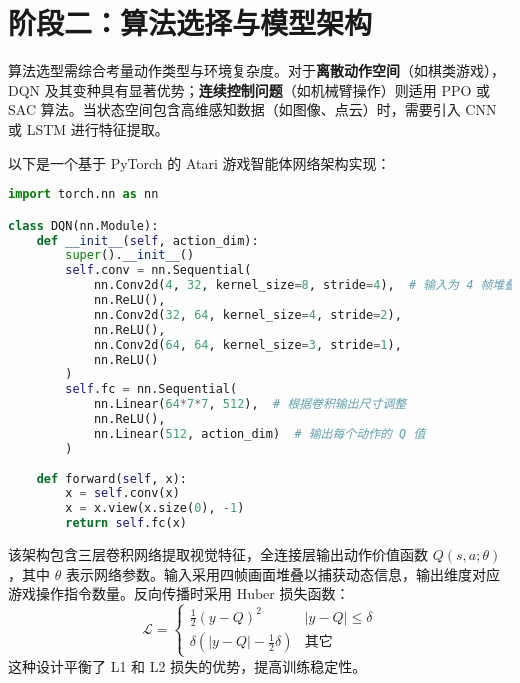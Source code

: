 \section{阶段二：算法选择与模型架构}
算法选型需综合考量动作类型与环境复杂度。对于\textbf{离散动作空间}（如棋类游戏），DQN 及其变种具有显著优势；\textbf{连续控制问题}（如机械臂操作）则适用 PPO 或 SAC 算法。当状态空间包含高维感知数据（如图像、点云）时，需要引入 CNN 或 LSTM 进行特征提取。\par
以下是一个基于 PyTorch 的 Atari 游戏智能体网络架构实现：\par
\begin{lstlisting}[language=python]
import torch.nn as nn

class DQN(nn.Module):
    def __init__(self, action_dim):
        super().__init__()
        self.conv = nn.Sequential(
            nn.Conv2d(4, 32, kernel_size=8, stride=4),  # 输入为 4 帧堆叠的游戏画面
            nn.ReLU(),
            nn.Conv2d(32, 64, kernel_size=4, stride=2),
            nn.ReLU(),
            nn.Conv2d(64, 64, kernel_size=3, stride=1),
            nn.ReLU()
        )
        self.fc = nn.Sequential(
            nn.Linear(64*7*7, 512),  # 根据卷积输出尺寸调整
            nn.ReLU(),
            nn.Linear(512, action_dim)  # 输出每个动作的 Q 值
        )
    
    def forward(self, x):
        x = self.conv(x)
        x = x.view(x.size(0), -1)
        return self.fc(x)
\end{lstlisting}
该架构包含三层卷积网络提取视觉特征，全连接层输出动作价值函数 $Q(s,a;\theta)$，其中 $\theta$ 表示网络参数。输入采用四帧画面堆叠以捕获动态信息，输出维度对应游戏操作指令数量。反向传播时采用 Huber 损失函数：
$$ \mathcal{L} = \begin{cases} \frac{1}{2}(y-Q)^2 & |y-Q| \leq \delta \\ \delta(|y-Q| - \frac{1}{2}\delta) & \text{其它} \end{cases} $$
这种设计平衡了 L1 和 L2 损失的优势，提高训练稳定性。\par
